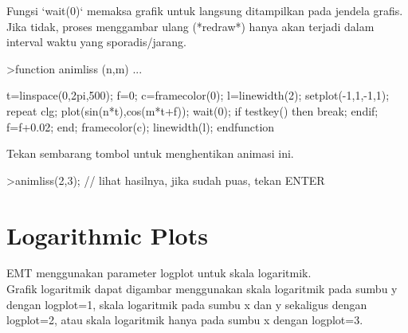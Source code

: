 \documentclass{article}
\newenvironment{eulernotebook}{\par}{\par}
\newcommand{\eulerheading}[1]{\section{#1}}
\newenvironment{eulercomment}{\par\medskip}{\par\medskip}
\begin{document}
\begin{eulernotebook}
\begin{eulercomment}
\begin{eulercomment}
\begin{eulercomment}
\begin{eulercomment}
\begin{eulercomment}
Fungsi `wait(0)` memaksa grafik untuk langsung ditampilkan pada
jendela grafis. Jika tidak, proses menggambar ulang (*redraw*) hanya
akan terjadi dalam interval waktu yang sporadis/jarang.
\end{eulercomment}
\begin{eulerprompt}
>function animliss (n,m) ...
\end{eulerprompt}
\begin{eulerudf}
  t=linspace(0,2pi,500);
  f=0;
  c=framecolor(0);
  l=linewidth(2);
  setplot(-1,1,-1,1);
  repeat
    clg;
    plot(sin(n*t),cos(m*t+f));
    wait(0);
    if testkey() then break; endif;
    f=f+0.02;
  end;
  framecolor(c);
  linewidth(l);
  endfunction
\end{eulerudf}
\begin{eulercomment}
Tekan sembarang tombol untuk menghentikan animasi ini.
\end{eulercomment}
\begin{eulerprompt}
>animliss(2,3); // lihat hasilnya, jika sudah puas, tekan ENTER
\end{eulerprompt}
\eulerheading{Logarithmic Plots}
\begin{eulercomment}
EMT menggunakan parameter logplot untuk skala logaritmik.\\
Grafik logaritmik dapat digambar menggunakan skala logaritmik pada
sumbu \textdollar{}y\textdollar{} dengan logplot=1, skala logaritmik pada sumbu \textdollar{}x\textdollar{} dan \textdollar{}y\textdollar{}
sekaligus dengan logplot=2, atau skala logaritmik hanya pada sumbu \textdollar{}x\textdollar{}
dengan logplot=3.


\end{eulercomment}
\end{eulercomment}
\end{eulercomment}
\end{eulercomment}
\end{eulercomment}
\end{eulernotebook}
\end{document}
